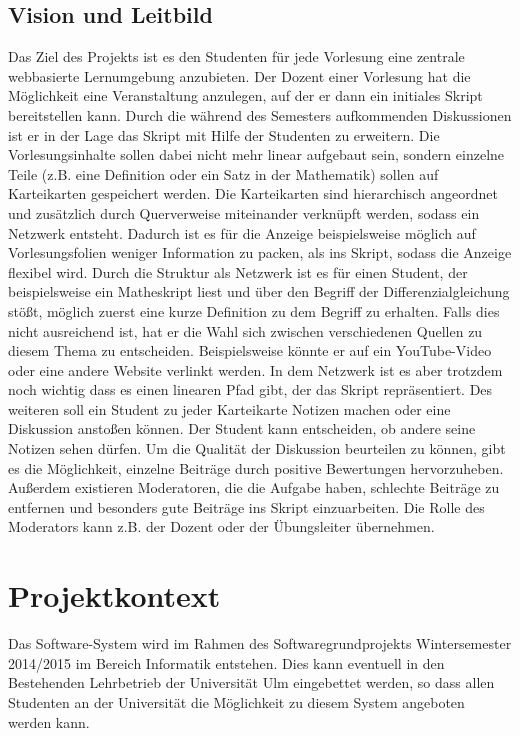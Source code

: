 \documentclass[12pt,a4paper]{article}
\begin{document}
\subsection{Vision und Leitbild}
Das Ziel des Projekts ist es den Studenten für jede Vorlesung eine zentrale webbasierte Lernumgebung anzubieten. Der Dozent einer Vorlesung hat die Möglichkeit eine Veranstaltung anzulegen, auf der er dann ein initiales Skript bereitstellen kann. Durch die während des Semesters aufkommenden Diskussionen ist er in der Lage das Skript mit Hilfe der Studenten zu erweitern. Die Vorlesungsinhalte sollen dabei nicht mehr linear aufgebaut sein, sondern einzelne Teile (z.B. eine Definition oder ein Satz in der Mathematik) sollen auf Karteikarten gespeichert werden. Die Karteikarten sind hierarchisch angeordnet und zusätzlich durch Querverweise miteinander verknüpft werden, sodass ein Netzwerk entsteht. Dadurch ist es für die Anzeige beispielsweise möglich auf Vorlesungsfolien weniger Information zu packen, als ins Skript, sodass die Anzeige flexibel wird. Durch die Struktur als Netzwerk ist es für einen Student, der beispielsweise ein Matheskript liest und über den Begriff der Differenzialgleichung stößt, möglich zuerst eine kurze Definition zu dem Begriff zu erhalten. Falls dies nicht ausreichend ist, hat er die Wahl sich zwischen verschiedenen Quellen zu diesem Thema zu entscheiden. Beispielsweise könnte er auf ein YouTube-Video oder eine andere Website verlinkt werden. In dem Netzwerk ist es aber trotzdem noch wichtig dass es einen linearen Pfad gibt, der das Skript repräsentiert. Des weiteren soll ein Student zu jeder Karteikarte Notizen machen oder eine Diskussion anstoßen können. Der Student kann entscheiden, ob andere seine Notizen sehen dürfen. Um die Qualität der Diskussion beurteilen zu können, gibt es die Möglichkeit, einzelne Beiträge durch positive Bewertungen hervorzuheben. Außerdem existieren Moderatoren, die die Aufgabe haben, schlechte Beiträge zu entfernen und besonders gute Beiträge ins Skript einzuarbeiten. Die Rolle des Moderators kann z.B. der Dozent oder der Übungsleiter übernehmen.



\section{Projektkontext}
Das Software-System wird im Rahmen des Softwaregrundprojekts Wintersemester 2014/2015 im Bereich Informatik entstehen. Dies kann eventuell in den Bestehenden Lehrbetrieb der Universität Ulm eingebettet werden, so dass allen Studenten an der Universität die Möglichkeit zu diesem System angeboten werden kann.
\end{document}
